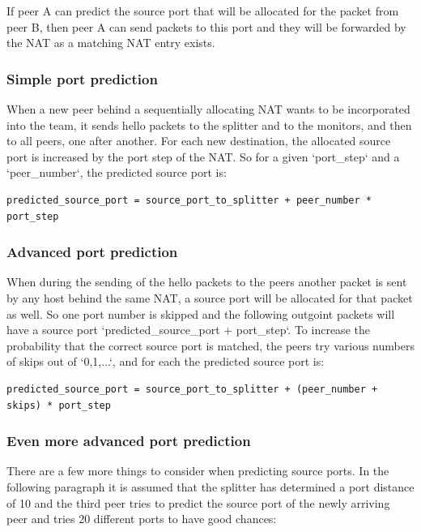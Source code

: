 \documentclass{article}
\begin{document}
If peer A can predict the source port that will be allocated for the
packet from peer B, then peer A can send packets to this port and they
will be forwarded by the NAT as a matching NAT entry exists.

\subsubsection{Simple port prediction}

When a new peer behind a sequentially allocating NAT wants to be
incorporated into the team, it sends hello packets to the splitter and
to the monitors, and then to all peers, one after another. For each
new destination, the allocated source port is increased by the port
step of the NAT. So for a given `port_step` and a `peer_number`, the
predicted source port is:

\begin{verbatim}
predicted_source_port = source_port_to_splitter + peer_number * port_step
\end{verbatim}

\subsubsection{Advanced port prediction}

When during the sending of the hello packets to the peers another
packet is sent by any host behind the same NAT, a source port will be
allocated for that packet as well. So one port number is skipped and
the following outgoint packets will have a source port
`predicted_source_port + port_step`. To increase the probability that
the correct source port is matched, the peers try various numbers of
skips out of `{0,1,...}`, and for each the predicted source port is:

\begin{verbatim}
predicted_source_port = source_port_to_splitter + (peer_number + skips) * port_step
\end{verbatim}

\subsubsection{Even more advanced port prediction}

There are a few more things to consider when predicting source
ports. In the following paragraph it is assumed that the splitter has
determined a port distance of 10 and the third peer tries to predict
the source port of the newly arriving peer and tries 20 different
ports to have good chances:
\end{document}
